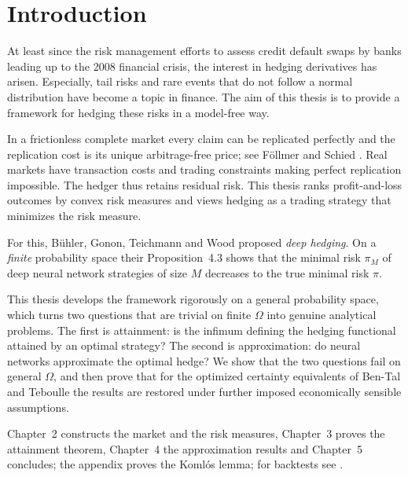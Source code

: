 \documentclass[11pt,a4paper]{report}
\begin{document}
\setcounter{chapter}{0}

\chapter{Introduction}

At least since the risk management efforts to assess credit default swaps by banks leading up to the 2008 financial crisis, the interest in hedging derivatives has arisen. Especially, tail risks and rare events that do not follow a normal distribution have become a topic in finance. The aim of this thesis is to provide a framework for hedging these risks in a model-free way.

In a frictionless complete market every claim can be replicated perfectly and the replication cost is its unique arbitrage-free price; see F\"ollmer and Schied \cite[Chapter~5]{foellmerschied}. Real markets have transaction costs and trading constraints making perfect replication impossible. The hedger thus retains residual risk. This thesis ranks profit-and-loss outcomes by convex risk measures \cite[Chapter~4]{foellmerschied} and views hedging as a trading strategy that minimizes the risk measure.

For this, B\"uhler, Gonon, Teichmann and Wood \cite{buehler} proposed \emph{deep hedging}. On a \emph{finite} probability space their Proposition~4.3 shows that the minimal risk $\pi_M$ of deep neural network strategies of size $M$ decreases to the true minimal risk $\pi$.

This thesis develops the framework rigorously on a general probability space, which turns two questions that are trivial on finite $\Omega$ into genuine analytical problems. The first is attainment: is the infimum defining the hedging functional attained by an optimal strategy? The second is approximation: do neural networks approximate the optimal hedge? We show that the two questions fail on general $\Omega$, and then prove that for the optimized certainty equivalents of Ben-Tal and Teboulle \cite{bentalteboulle} the results are restored under further imposed economically sensible assumptions.

Chapter~2 constructs the market and the risk measures, Chapter~3 proves the attainment theorem, Chapter~4 the approximation results and Chapter~5 concludes; the appendix proves the Koml\'os lemma; for backtests see \cite{buehler}.
\end{document}
